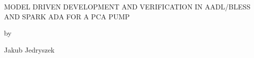 \begin{center}

   \vspace{1cm}


   \large MODEL DRIVEN DEVELOPMENT AND VERIFICATION IN AADL/BLESS AND SPARK ADA FOR A PCA PUMP\\

   \vspace{0.3cm}

   by\\

   \vspace{0.3cm}


   \large Jakub Jedryszek\\

   \vspace{0.3cm}



\end{center}

